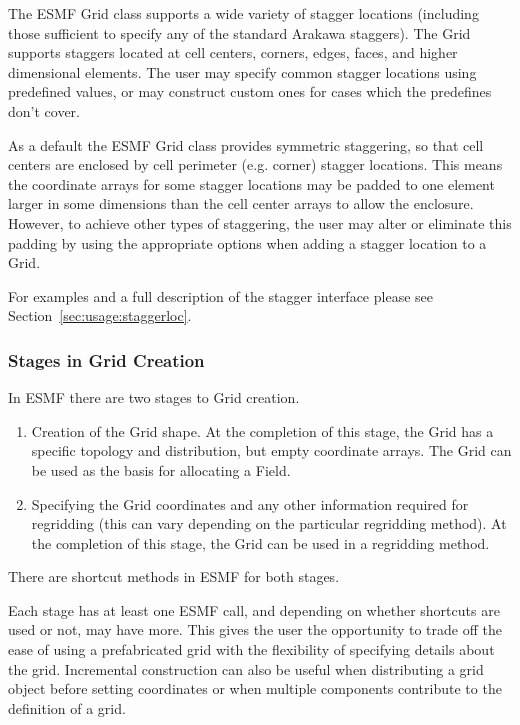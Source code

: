 The ESMF Grid class supports a wide variety of stagger locations (including
those sufficient to specify any of the standard Arakawa staggers). The 
Grid supports staggers located at cell centers, corners, edges, 
faces, and higher dimensional elements. The user may specify
common stagger locations using predefined values, or may construct
custom ones for cases which the predefines don't cover.

As a default the ESMF Grid class provides symmetric staggering, so
that cell centers are enclosed by cell perimeter (e.g. corner) 
stagger locations. This means the coordinate arrays for
some stagger locations may be padded to one element larger in some
dimensions than the cell center arrays to allow the enclosure. 
However, to achieve other types of staggering, the user may alter 
or eliminate this padding by using the appropriate options when adding
a stagger location to a Grid. 
 
For examples and a full description of the stagger interface 
please see Section~\ref{sec:usage:staggerloc}. 

\subsubsection{Stages in Grid Creation} 

In ESMF there are two stages to Grid creation.
\begin{enumerate}
\item Creation of the Grid shape.  At the completion of this
stage, the Grid has a specific topology and distribution, but
empty coordinate arrays.  The Grid can be used as the basis for
allocating a Field.
\item Specifying the Grid coordinates and any other information
required for regridding (this can vary depending on the 
particular regridding method).  At the completion of this
stage, the Grid can be used in a regridding method.
\end{enumerate}
There are shortcut methods in ESMF for both stages.

Each stage has at least one ESMF call, and depending on 
whether shortcuts are used or not, may have more.
This gives the user the opportunity to trade off the 
ease of using a prefabricated grid with the flexibility 
of specifying details about the grid.  Incremental
construction can also be useful when distributing a grid object
before setting coordinates or when multiple components
contribute to the definition of a grid. 

